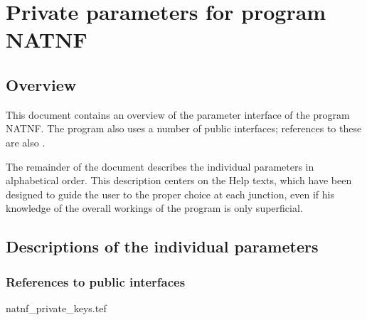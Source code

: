 
\chapter{ Private parameters for program NATNF}
\tableofcontents


\section{ Overview}

	This document contains an overview of the parameter interface of the
program NATNF. The program also uses a number of public interfaces; references
to these are also .



	The remainder of the document describes the individual parameters in
alphabetical order. This description centers on the Help texts, which have been
designed to guide the user to the proper choice at each junction, even if his
knowledge of the overall workings of the program is only superficial.


\section{ Descriptions of the individual parameters}
\label{.descriptions}

\subsection{ References to public interfaces}
\label{.public}

 {natnf_private_keys.tef}
